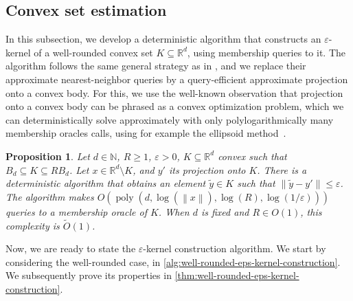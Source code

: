 \documentclass[11pt]{article}
\newtheorem{proposition}[theorem]{Proposition}
\newcommand{\N}{\ensuremath{\mathbb{N}}}
\newcommand{\R}{\ensuremath{\mathbb{R}}}
\newcommand{\norm}[1]{\ensuremath{\left\|#1\right\|}}
\DeclareMathOperator{\poly}{poly}
\begin{document}
    \subsection{Convex set estimation}
    \label{subsec:alg-conv-est}

    In this subsection, we develop a deterministic algorithm that constructs an $\varepsilon$-kernel of a well-rounded convex set $K \subseteq \R^d$, using membership queries to it. The algorithm follows the same general strategy as in \cite{yu2008practical}, and we replace their approximate nearest-neighbor queries by a query-efficient approximate projection onto a convex body. For this, we use the well-known observation that projection onto a convex body can be phrased as a convex optimization problem, which we can deterministically solve approximately with only polylogarithmically many membership oracles calls, using for example the ellipsoid method~\cite{grotschel2012geometric}.

    \begin{proposition}
        \label{prop:alg-proj}
        Let $d \in \N$, $R \geq 1$, $\varepsilon > 0$, $K \subseteq \R^d$ convex such that $B_d \subseteq K \subseteq RB_d$. Let $x \in \R^d \setminus K$, and $y'$ its projection onto $K$. There is a deterministic algorithm that obtains an element $\widetilde{y} \in K$ such that $\norm{\widetilde{y} - y'} \leq \varepsilon$. The algorithm makes $O(\poly(d,\log(\norm{x}),\log(R),\log(1/\varepsilon)))$ queries to a membership oracle of $K$. When $d$ is fixed and $R \in O(1)$, this complexity is $\widetilde{O}(1)$.
    \end{proposition}

    Now, we are ready to state the $\varepsilon$-kernel construction algorithm. We start by considering the well-rounded case, in \cref{alg:well-rounded-eps-kernel-construction}. We subsequently prove its properties in \cref{thm:well-rounded-eps-kernel-construction}.
\end{document}
